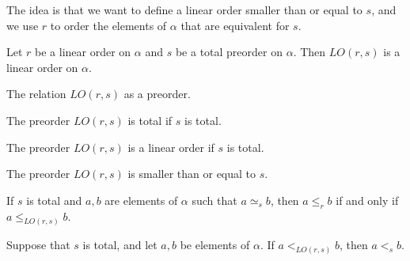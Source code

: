 The idea is that we want to define a linear order smaller than or equal to $s$, and we use $r$ to order the elements
of $\alpha$ that are equivalent for $s$.

\begin{sublemma}
Let $r$ be a linear order on $\alpha$ and $s$ be a total preorder on $\alpha$. Then $LO(r,s)$ is a linear order on $\alpha$.

\end{sublemma}

\begin{subdefi}
The relation $LO(r,s)$ as a preorder.

\end{subdefi}

\begin{sublemma}
The preorder $LO(r,s)$ is total if $s$ is total.

\end{sublemma}

\begin{sublemma}
The preorder $LO(r,s)$ is a linear order if $s$ is total.

\end{sublemma}

\begin{sublemma}
The preorder $LO(r,s)$ is smaller than or equal to $s$.

\end{sublemma}

\begin{sublemma}
If $s$ is total and $a,b$ are elements of $\alpha$ such that $a\simeq_s b$, then
$a\le_r b$ if and only if $a\le_{LO(r,s)}b$.

\end{sublemma}

\begin{sublemma}
Suppose that $s$ is total, and let $a,b$ be elements of $\alpha$. If $a<_{LO(r,s)}b$, then $a<_s b$.

\end{sublemma}

